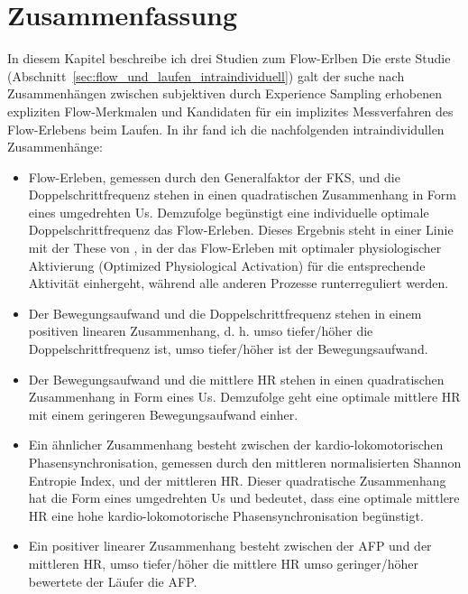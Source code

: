 

\section{Zusammenfassung} \label{sec:zusammenfassung_5}

In diesem Kapitel beschreibe ich drei Studien zum Flow-Erlben Die erste Studie (Abschnitt~\ref{sec:flow_und_laufen_intraindividuell}) galt der suche nach Zusammenhängen zwischen subjektiven durch Experience Sampling erhobenen expliziten Flow-Merkmalen und Kandidaten für ein implizites Messverfahren des Flow-Erlebens beim Laufen. In ihr fand ich die nachfolgenden intraindividullen Zusammenhänge: 
\begin{itemize}
	\item Flow-Erleben, gemessen durch den Generalfaktor der \ac{FKS}, und die Doppelschrittfrequenz stehen in einen quadratischen Zusammenhang in Form eines umgedrehten Us. Demzufolge begünstigt eine individuelle optimale Doppelschrittfrequenz das Flow-Erleben. Dieses Ergebnis steht in einer Linie mit der These von \citet[][S.~148]{Peifer2012}, in der das Flow-Erleben mit optimaler physiologischer Aktivierung (Optimized Physiological Activation) für die entsprechende Aktivität einhergeht, während alle anderen Prozesse runterreguliert werden.
	
	\item Der Bewegungsaufwand und die Doppelschrittfrequenz stehen in einem positiven linearen Zusammenhang, d. h. umso tiefer/höher die Doppelschrittfrequenz ist, umso tiefer/höher ist der Bewegungsaufwand.
	
	\item Der Bewegungsaufwand und die mittlere \ac{HR} stehen in einen quadratischen Zusammenhang in Form eines Us. Demzufolge geht eine optimale mittlere \ac{HR} mit einem geringeren Bewegungsaufwand einher.
	
	\item Ein ähnlicher Zusammenhang besteht zwischen der kardio-lokomotorischen Phasensynchronisation, gemessen durch den mittleren normalisierten Shannon Entropie Index, und der mittleren \ac{HR}. Dieser quadratische Zusammenhang hat die Form eines umgedrehten Us und bedeutet, dass eine optimale mittlere \ac{HR} eine hohe kardio-lokomotorische Phasensynchronisation begünstigt. 
	
	\item Ein positiver linearer Zusammenhang besteht zwischen der \ac{AFP} und der mittleren \ac{HR}, umso tiefer/höher die mittlere \ac{HR} umso geringer/höher bewertete der Läufer die \ac{AFP}. 
\end{itemize}

